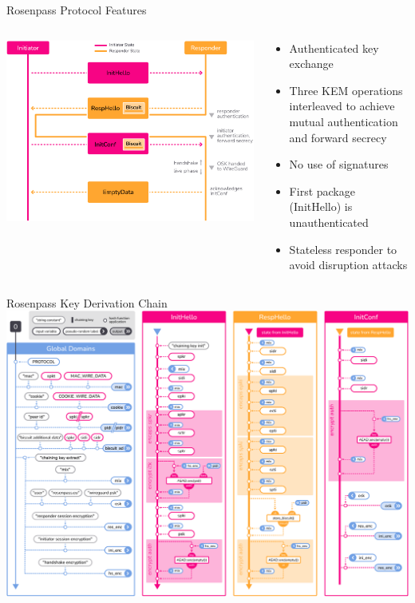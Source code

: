 




\begin{frame}{Rosenpass Protocol Features}
\hypertarget{the-rosenpass-protocol-1}{}
  \begin{columns}[fullwidth,c]
    \begin{column}{.6\linewidth}
      \includegraphics[width=\linewidth]{graphics/rosenpass-wp-key-exchange-protocol-rgb.pdf}
    \end{column}

    \begin{column}{.4\linewidth}
      \begin{itemize}
        \item Authenticated key exchange
        \item Three KEM operations interleaved to achieve mutual authentication and forward secrecy
        \item No use of signatures
        \item First package (InitHello) is unauthenticated
        \item Stateless responder to avoid disruption attacks
      \end{itemize}
    \end{column}
  \end{columns}
\end{frame}





\begin{frame}{Rosenpass Key Derivation Chain}
  \hypertarget{rosenpass-kdf-chain}{}
  \centering
  \includegraphics[height=.85\textheight]{graphics/rosenpass-wp-hashing-tree-rgb.pdf}
\end{frame}


